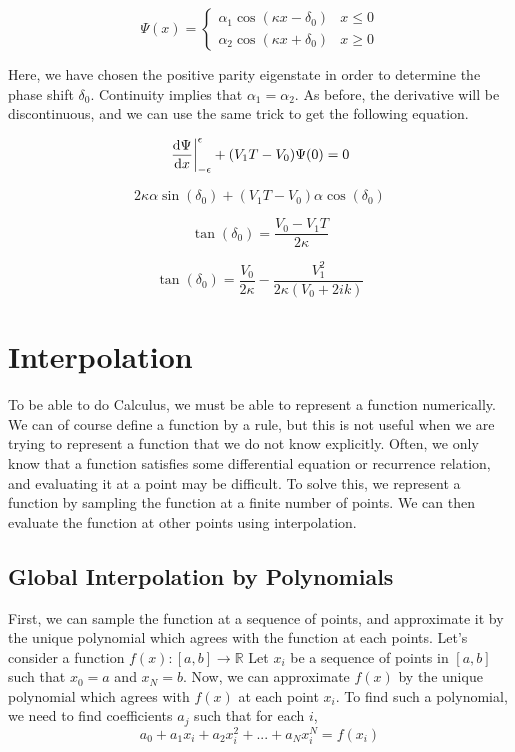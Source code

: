 \documentclass[12pt,letterpaper]{article}
\numberwithin{equation}{section}
\newcommand{\beq}{\begin{equation}}
\newcommand{\eeq}{\end{equation}}
\newcommand{\reals}{\mathbb{R}}
\begin{document}
\beq
\Psi(x) = 
\begin{cases}
\alpha_1\cos(\kappa x - \delta_0) & x \leq 0 \\
\alpha_2\cos(\kappa x + \delta_0) & x \geq 0
\end{cases}
\eeq

\noindent Here, we have chosen the positive parity eigenstate in order to determine the phase shift $\delta_0$. Continuity implies that $\alpha_1 = \alpha_2$. As before, the derivative will be discontinuous, and we can use the same trick to get the following equation.

\beq
\eval{\dv{\Psi}{x}}_{-\epsilon}^\epsilon + (V_1T - V_0)\Psi(0) = 0
\eeq

\beq
2\kappa \alpha \sin(\delta_0) + (V_1T - V_0)\alpha \cos(\delta_0)
\eeq

\beq
\tan(\delta_0) = \frac{V_0 - V_1T}{2\kappa}
\eeq

\beq
\tan(\delta_0) = \frac{V_0}{2\kappa} - \frac{V_1^2}{2\kappa(V_0 + 2ik)}
\eeq


\newpage
\appendix

\section{Interpolation}
To be able to do Calculus, we must be able to represent a function numerically. We can of course define a function by a rule, but this is not useful when we are trying to represent a function that we do not know explicitly. Often, we only know that a function satisfies some differential equation or recurrence relation, and evaluating it at a point may be difficult. To solve this, we represent a function by sampling the function at a finite number of points. We can then evaluate the function at other points using interpolation.

\subsection{Global Interpolation by Polynomials}
First, we can sample the function at a sequence of points, and approximate it by the unique polynomial which agrees with the function at each points. Let's consider a function $f(x) : [a,b] \rightarrow \reals$ Let $x_i$ be a sequence of points in $[a,b]$ such that $x_0 = a$ and $x_N = b$. Now, we can approximate $f(x)$ by the unique polynomial which agrees with $f(x)$ at each point $x_i$. To find such a polynomial, we need to find coefficients $a_j$ such that for each $i$,
\beq
a_0 + a_1 x_i + a_2 x_i^2 + ... + a_N x_i^N = f(x_i)
\eeq
\end{document}
